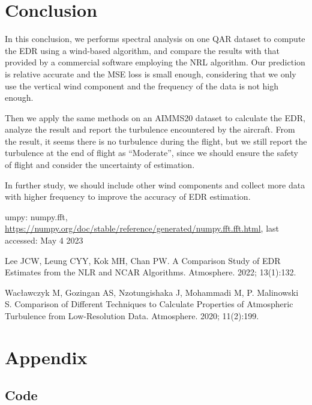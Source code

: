 \documentclass[runningheads]{llncs}
\begin{document}
\section{Conclusion}

In this conclusion, we performs spectral analysis on one QAR dataset to compute the EDR using a wind-based algorithm, and compare the results with that provided by a commercial software employing the NRL algorithm. 
Our prediction is relative accurate and the MSE loss is small enough, considering that we only use the vertical wind component and the frequency of the data is not high enough.

Then we apply the same methods on an AIMMS20 dataset to calculate the EDR, analyze the result and report the turbulence encountered by the aircraft. From the result, it seems there is no turbulence during the flight, but we still report the turbulence at the end of flight as “Moderate”, since we should ensure the safety of flight and consider the uncertainty of estimation.

In further study, we should include other wind components and collect more data with higher frequency to improve the accuracy of EDR estimation.

\begin{thebibliography}{8}
    umpy: numpy.fft, \url{https://numpy.org/doc/stable/reference/generated/numpy.fft.fft.html}, last accessed: May 4 2023
    
    Lee JCW, Leung CYY, Kok MH, Chan PW. A Comparison Study of EDR Estimates from the NLR and NCAR Algorithms. Atmosphere. 2022; 13(1):132. 

    Wacławczyk M, Gozingan AS, Nzotungishaka J, Mohammadi M, P. Malinowski S. Comparison of Different Techniques to Calculate Properties of Atmospheric Turbulence from Low-Resolution Data. Atmosphere. 2020; 11(2):199.
\end{thebibliography}

\section*{Appendix}
\subsection*{Code}


\end{document}
